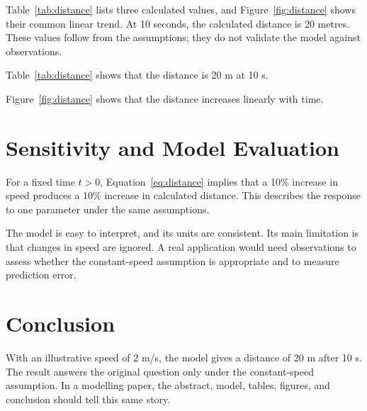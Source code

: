 \documentclass[11pt,letterpaper]{article}
\begin{document}
Table~\ref{tab:distance} lists three calculated values, and
Figure~\ref{fig:distance} shows their common linear trend.
At 10 seconds, the calculated distance is 20 metres. These values follow
from the assumptions; they do not validate the model against observations.

Table~\ref{tab:distance} shows that the distance is 20 m
at 10 s.

Figure~\ref{fig:distance} shows that the distance increases linearly with time.
\clearpage

\section{Sensitivity and Model Evaluation}
For a fixed time $t>0$, Equation~\eqref{eq:distance} implies that a
10\% increase in speed produces a 10\% increase in calculated distance.
This describes the response to one parameter under the same assumptions.

The model is easy to interpret, and its units are consistent. Its main
limitation is that changes in speed are ignored. A real application would
need observations to assess whether the constant-speed assumption is
appropriate and to measure prediction error.

\section{Conclusion}
With an illustrative speed of 2 m/s, the model gives a distance of
20 m after 10 s. The result answers the original question only under the
constant-speed assumption. In a modelling paper, the abstract, model,
tables, figures, and conclusion should tell this same story.



\end{document}

